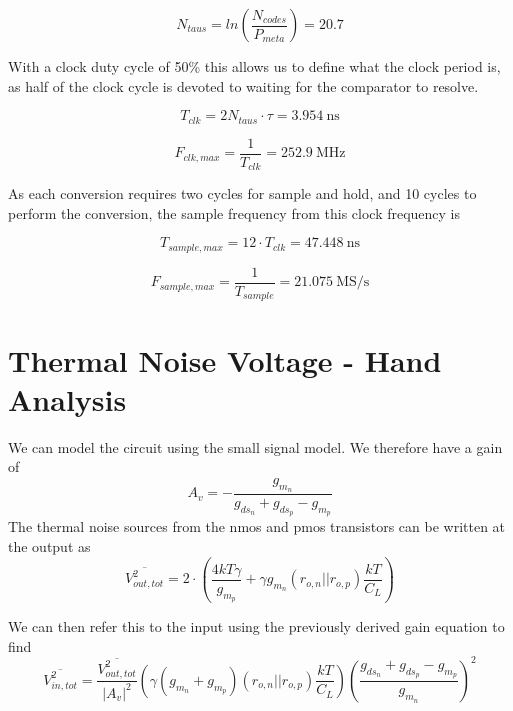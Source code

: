 \documentclass[letterpaper, notitlepage]{revtex4-1}
\begin{document}
  \begin{equation}
    N_{taus} = ln\left(\frac{N_{codes}}{P_{meta}}\right) = 20.7
  \end{equation}

  With a clock duty cycle of 50\% this allows us to define what the clock
  period is, as half of the clock cycle is devoted to waiting for the
  comparator to resolve.

  \begin{equation}
    T_{clk} = 2 N_{taus} \cdot \tau = \SI{3.954}{\nano\second}
  \end{equation}

  \begin{equation}
    F_{clk,max} = \frac{1}{T_{clk}} = \SI{252.9}{\mega\hertz}
  \end{equation}

  As each conversion requires two cycles for sample and hold, and 10 cycles
  to perform the conversion, the sample frequency from this clock frequency is

  \begin{equation}
      T_{sample,max} = 12 \cdot T_{clk} = \SI{47.448}{\nano\second}
  \end{equation}

  \begin{equation}
    F_{sample,max} = \frac{1}{T_{sample}} = \SI{21.075}{\mega\siemens\per\second}  %
  \end{equation}

\section{Thermal Noise Voltage - Hand Analysis}
We can model the circuit using the small signal model. We therefore have a gain of
\begin{equation}
A_v=-\frac{g_{m_n}}{g_{ds_{n}}+g_{ds_{p}}-g_{m_p}}
\end{equation}
The thermal noise sources from the nmos and pmos transistors can be written at the output as
\begin{equation}
\overline{V_{out,tot}^2}=2\cdot\left(\frac{4kT\gamma}{g_{m_p}}+\gamma g_{m_n}\left(r_{o,n}||r_{o,p}\right)\frac{kT}{C_L}\right)
\end{equation}

We can then refer this to the input using the previously derived gain equation to find
\begin{equation}
\overline{V^2_{in,tot}}=\frac{\overline{V_{out,tot}^2}}{\left|A_v\right|^2}\left(\gamma\left(g_{m_n}+g_{m_p}\right)\left(r_{o,n}||r_{o,p}\right)\frac{kT}{C_L}\right)\left(\frac{g_{ds_{n}}+g_{ds_{p}}-g_{m_p}}{g_{m_n}}\right)^2
\end{equation}
\end{document}

